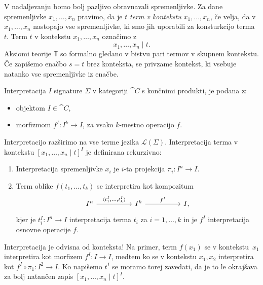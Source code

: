 \documentclass[../kategoricna_logika.tex]{subfiles}
\begin{document}
V nadaljevanju bomo bolj pazljivo obravnavali spremenljivke.
Za dane spremenljivke $x_1, \ldots, x_n$ pravimo, da je $t$ \emph{term v kontekstu} $x_1, \ldots, x_n$,
če velja, da v $x_1, \ldots, x_n$ nastopajo vse spremenljivke, ki smo jih uporabili za
konsturkcijo terma $t$. Term $t$ v kontekstu $x_1, \ldots, x_n$ označimo z
$$x_1, \ldots, x_n \mid t.$$
Aksiomi teorije $\mathbb{T}$ so formalno gledano v bistvu pari termov v skupnem kontekstu.
Če zapišemo enačbo $s = t$ brez konteksta, se privzame kontekst, ki vsebuje natanko vse spremenljivke
iz enačbe.
\begin{definicija}
  Interpretacija $I$ signature $\Sigma$ v kategoriji $\cat{C}$ s končnimi produkti, je podana z:
  \begin{itemize}
  \item objektom $I \in \cat{C}$,
  \item morfizmom $f^I : I^k \to I$, za vsako $k$-mestno operacijo $f$.
  \end{itemize}
%
  Interpretacijo razširimo na vse terme jezika $\mathcal{L}(\Sigma)$.
  Interpretacija terma v kontekstu $[x_1, \ldots, x_n \mid t]^{I}$ je definirana rekurzivno:
  \begin{enumerate}
  \item Interpretacija spremenljivke $x_i$ je $i$-ta projekcija
    $\pi_i : I^n \to I.$
%
  \item Term oblike $f(t_1, \ldots, t_k)$ se interpretira kot
    kompozitum
    \begin{equation*}
      \begin{tikzcd}[column sep = 5em]
        I^n \ar[r, "{\langle t_1^I, \ldots, t_k^I\rangle}"] & I^k \ar[r, "f^I"] & I,
      \end{tikzcd}
    \end{equation*}
    kjer je $t_i^I : I^n \to I$ interpretacija terma $t_i$ za
    $i = 1, \ldots, k$ in je $f^I$ interpretacija osnovne operacije
    $f$.
  \end{enumerate}
\end{definicija}
%
\begin{opomba}
Interpretacija je odvisna od konteksta! Na primer, 
  term $f(x_1)$ se v kontekstu~$x_1$ interpretira kot morfizem
  $f^I : I \to I$, medtem ko se v kontekstu $x_1, x_2$ interpretira
  kot $f^I \circ \pi_1 : I^2 \to I$. Ko napišemo $t^I$ se moramo
  torej zavedati, da je to le okrajšava za bolj natančen zapis
  $[x_1, \ldots, x_n \mid t]^I$.
\end{opomba}
%
\end{document}
